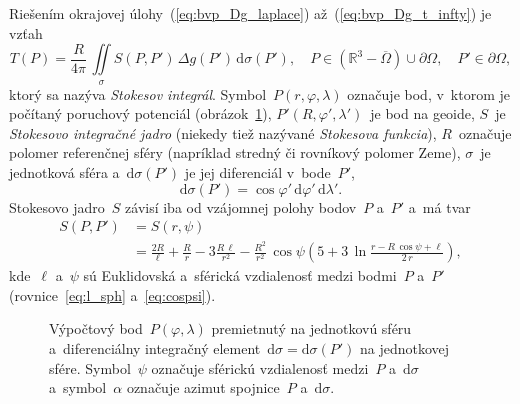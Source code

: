 \documentclass[a4paper, 12pt]{book}
\newcommand{\diff}{\mathrm d}
\begin{document}
Riešením okrajovej úlohy~(\ref{eq:bvp_Dg_laplace}) až~(\ref{eq:bvp_Dg_t_infty}) 
je vzťah
%
\begin{equation}
\label{eq:stokes}
T(P) = \frac{R}{4\pi} \, \iint\limits_{\sigma} S(P, P') \, \Delta g(P') \, 
\diff \sigma(P'){,} \quad P \in \left( \mathbb{R}^3 - \overline\Omega \right) 
\cup \partial\Omega{,} \quad P' \in \partial\Omega{,}
\end{equation}
%
ktorý sa nazýva \emph{Stokesov integrál}.  Symbol~$P(r, \varphi, \lambda)$ 
označuje bod, v~ktorom je počítaný poruchový potenciál 
(obrázok~\ref{fig:surface_integral}), $P'(R, \varphi', \lambda')$~je bod na 
geoide, $S$~je \emph{Stokesovo integračné jadro} (niekedy tiež nazývané 
\emph{Stokesova funkcia}), $R$~označuje polomer referenčnej sféry (napríklad 
stredný či rovníkový polomer Zeme), $\sigma$~je jednotková sféra 
a~$\diff\sigma(P')$ je jej diferenciál v~bode~$P'$,
%
\begin{equation}
\label{eq:diff_sigma}
\diff\sigma(P') = \cos\varphi' \, \diff\varphi' \, \diff\lambda'{.}
\end{equation}
%
Stokesovo jadro~$S$ závisí iba od vzájomnej polohy bodov~$P$ a~$P'$ a~má tvar
\parencite{MoritzPhysicalGeodesy}
%
\begin{equation}
\label{eq:stokes_kernel_general}
\begin{split}
S(P, P') &= S(r, \psi)\\
%
&= \frac{2R}{\ell} + \frac{R}{r} - 3\frac{R \, \ell}{r^2} - \frac{R^2}{r^2} \, 
\cos\psi\left( 5 + 3 \, \ln \frac{r - R \, \cos\psi + \ell}{2 \, r} \right){,}
\end{split}
\end{equation}
%
kde~$\ell$ a~$\psi$ sú Euklidovská a~sférická vzdialenosť medzi bodmi~$P$ 
a~$P'$ (rovnice~\ref{eq:l_sph} a~\ref{eq:cospsi}).

\begin{figure}[bt]
\centering

\caption{Výpočtový bod~$P(\varphi, \lambda)$ premietnutý na jednotkovú sféru 
a~diferenciálny integračný element~$\diff\sigma = \diff\sigma(P')$ na 
jednotkovej sfére.  Symbol~$\psi$ označuje sférickú vzdialenosť medzi~$P$ 
a~$\diff\sigma$ a~symbol~$\alpha$ označuje azimut spojnice~$P$ 
a~$\diff\sigma$.}
\label{fig:surface_integral}
\end{figure}
\end{document}
